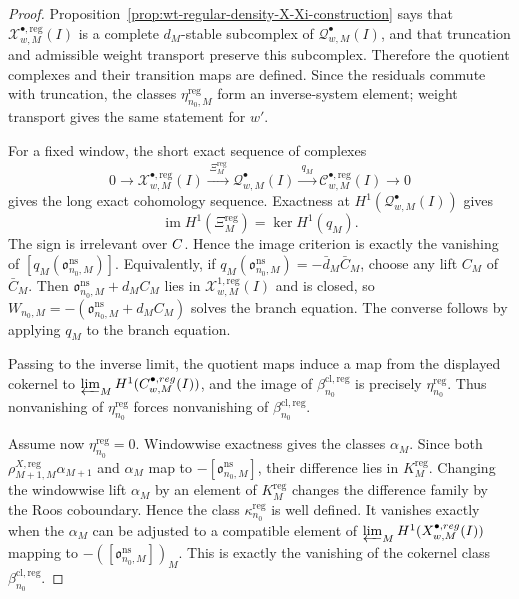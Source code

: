 \begin{proof}
  Proposition~\ref{prop:wt-regular-density-X-Xi-construction} says that
  \(\mathcal X^{\bullet,\mathrm{reg}}_{w,M}(I)\) is a complete
  \(d_M\)-stable subcomplex of \(\mathcal Q^\bullet_{w,M}(I)\), and that
  truncation and admissible weight transport preserve this subcomplex.
  Therefore the quotient complexes and their transition maps are defined.
  Since the residuals commute with truncation, the classes
  \(\eta^{\mathrm{reg}}_{n_0,M}\) form an inverse-system element; weight
  transport gives the same statement for \(w'\).

  For a fixed window, the short exact sequence of complexes
  \[
    0\longrightarrow
    \mathcal X^{\bullet,\mathrm{reg}}_{w,M}(I)
    \xrightarrow{\ \Xi^{\mathrm{reg}}_M\ }
    \mathcal Q^\bullet_{w,M}(I)
    \xrightarrow{\ q_M\ }
    \mathcal C^{\bullet,\mathrm{reg}}_{w,M}(I)
    \longrightarrow0
  \]
  gives the long exact cohomology sequence.  Exactness at
  \(H^1(\mathcal Q^\bullet_{w,M}(I))\) gives
  \[
    \operatorname{im}H^1(\Xi^{\mathrm{reg}}_M)
      =
    \ker H^1(q_M).
  \]
  The sign is irrelevant over \(\C\).  Hence the image criterion is
  exactly the vanishing of
  \([q_M(\mathfrak o^{\mathrm{ns}}_{n_0,M})]\).  Equivalently, if
  \(q_M(\mathfrak o^{\mathrm{ns}}_{n_0,M})=-\bar d_M\bar C_M\), choose
  any lift \(C_M\) of \(\bar C_M\).  Then
  \(\mathfrak o^{\mathrm{ns}}_{n_0,M}+d_MC_M\) lies in
  \(\mathcal X^{1,\mathrm{reg}}_{w,M}(I)\) and is closed, so
  \(W_{n_0,M}=-(\mathfrak o^{\mathrm{ns}}_{n_0,M}+d_MC_M)\) solves the
  branch equation.  The converse follows by applying \(q_M\) to the
  branch equation.

  Passing to the inverse limit, the quotient maps induce a map from the
  displayed cokernel to
  \(\varprojlim_MH^1(\mathcal C^{\bullet,\mathrm{reg}}_{w,M}(I))\), and
  the image of \(\beta^{\mathrm{cl},\mathrm{reg}}_{n_0}\) is precisely
  \(\eta^{\mathrm{reg}}_{n_0}\).  Thus nonvanishing of
  \(\eta^{\mathrm{reg}}_{n_0}\) forces nonvanishing of
  \(\beta^{\mathrm{cl},\mathrm{reg}}_{n_0}\).

  Assume now \(\eta^{\mathrm{reg}}_{n_0}=0\).  Windowwise exactness gives
  the classes \(\alpha_M\).  Since both
  \(\rho^{X,\mathrm{reg}}_{M+1,M}\alpha_{M+1}\) and \(\alpha_M\) map to
  \(-[\mathfrak o^{\mathrm{ns}}_{n_0,M}]\), their difference lies in
  \(K^{\mathrm{reg}}_M\).  Changing the windowwise lift \(\alpha_M\) by
  an element of \(K^{\mathrm{reg}}_M\) changes the difference family by
  the Roos coboundary.  Hence the class
  \(\kappa^{\mathrm{reg}}_{n_0}\) is well defined.  It vanishes exactly
  when the \(\alpha_M\) can be adjusted to a compatible element of
  \(\varprojlim_MH^1(\mathcal X^{\bullet,\mathrm{reg}}_{w,M}(I))\)
  mapping to
  \(-([\mathfrak o^{\mathrm{ns}}_{n_0,M}])_M\).  This is exactly the
  vanishing of the cokernel class
  \(\beta^{\mathrm{cl},\mathrm{reg}}_{n_0}\).


\end{proof}
